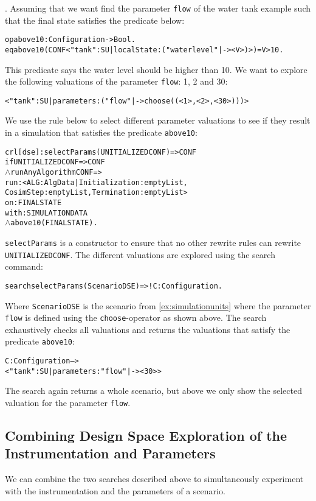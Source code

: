 \begin{example}\label{ex:dse}.
  Assuming that we want find the parameter \texttt{flow} of the water tank example such that the final state satisfies the predicate below:
  \scriptsize
  \begin{alltt}
op above10 : Configuration -> Bool .
eq above10(CONF < "tank" : SU | localState : ( "waterlevel" |-> < V >) >) = V > 10 .  
  \end{alltt}
  \normalsize
This predicate says the water level should be higher than 10.
We want to explore the following valuations of the parameter \texttt{flow}: 1, 2 and 30:
\small
\begin{alltt}
< "tank" : SU | parameters : ("flow" |-> choose((< 1 >,< 2 >,< 30 >))) >
\end{alltt}
\normalsize
We use the rule below to select different parameter valuations to see if they result in a simulation that satisfies the predicate \texttt{above10}:
\small
\begin{alltt}
  crl [dse] : selectParams(UNITIALIZEDCONF) => CONF 
  if UNITIALIZEDCONF => CONF
  \(\land\) runAnyAlgorithm CONF => 
      run: < ALG : AlgData | Initialization : emptyList, 
      CosimStep : emptyList, Termination : emptyList > 
      on: FINALSTATE
      with: SIMULATIONDATA
  \(\land\) above10(FINALSTATE) .
\end{alltt}
\normalsize
\texttt{selectParams} is a constructor to ensure that no other rewrite rules can rewrite \texttt{UNITIALIZEDCONF}.
The different valuations are explored using the search command:
\small
\begin{alltt}
  search selectParams(ScenarioDSE)  =>! C:Configuration .
\end{alltt}
\normalsize
Where \texttt{ScenarioDSE} is the scenario from \cref{ex:simulationunits} where the parameter \texttt{flow} is defined using the \texttt{choose}-operator as shown above.
The search exhaustively checks all valuations and returns the valuations that satisfy the predicate \texttt{above10}:
\small
\begin{alltt}
C:Configuration --> 
  < "tank" : SU | parameters : "flow" |-> < 30 > >
\end{alltt}
\normalsize
The search again returns a whole scenario, but above we only show the selected valuation for the parameter \texttt{flow}.
\end{example}

\subsection{Combining Design Space Exploration of the Instrumentation and Parameters}
We can combine the two searches described above to simultaneously  experiment with the instrumentation and the parameters of a scenario.

